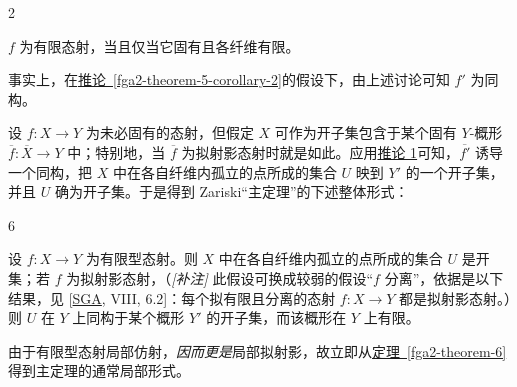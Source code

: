 \begin{corollary}{2}\label{fga2-theorem-5-corollary-2}\skipsinglepar
\par{}\(f\) 为有限态射，当且仅当它固有且各纤维有限。\end{corollary}
\par{}事实上，在\hyperref[fga2-theorem-5-corollary-2]{推论~\ref*{fga2-theorem-5-corollary-2}}的假设下，由上述讨论可知 \(f'\) 为同构。
\par{}设 \(f\colon  X\to  Y\) 为未必固有的态射，但假定 \(X\) 可作为开子集包含于某个固有 \(Y\)-概形 \(\overline {f}\colon \overline {X}\to  Y\) 中；特别地，当 \(\overline {f}\) 为拟射影态射时就是如此。应用\hyperref[fga2-theorem-5-corollary-1]{推论 1}可知，\(\overline {f'}\) 诱导一个同构，把 \(X\) 中在各自纤维内孤立的点所成的集合 \(U\) 映到 \(Y'\) 的一个开子集，并且 \(U\) 确为开子集。于是得到 Zariski“主定理”的下述整体形式：
\begin{theorem}{6}\label{fga2-theorem-6}\skipsinglepar
\par{}设 \(f\colon  X\to  Y\) 为有限型态射。则 \(X\) 中在各自纤维内孤立的点所成的集合 \(U\) 是开集；若 \(f\) 为拟射影态射，（\emph{[补注]} 此假设可换成较弱的假设“\(f\) 分离”，依据是以下结果，见 [\hyperref[Gro1960b]{SGA}, VIII, 6.2]：每个拟有限且分离的态射 \(f\colon  X\to  Y\) 都是拟射影态射。）则 \(U\) 在 \(Y\) 上同构于某个概形 \(Y'\) 的开子集，而该概形在 \(Y\) 上有限。\end{theorem}
\par{}由于有限型态射局部仿射，\emph{因而更是}局部拟射影，故立即从\hyperref[fga2-theorem-6]{定理~\ref*{fga2-theorem-6}}得到主定理的通常局部形式。
